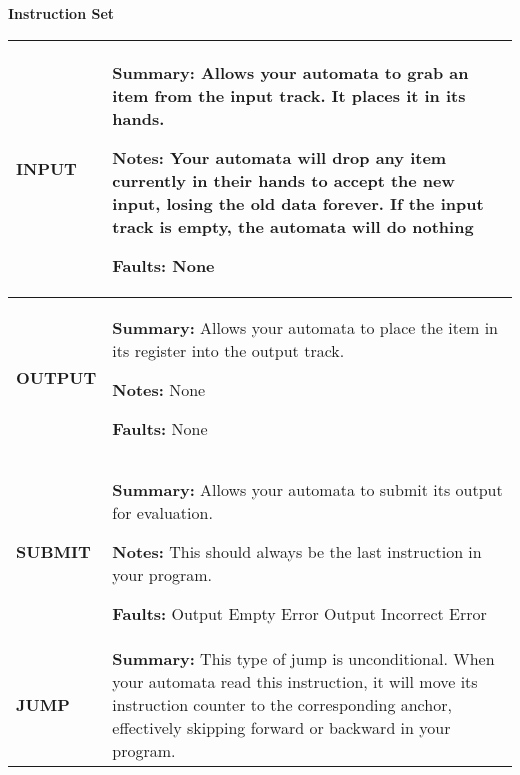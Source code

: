 \textbf{Instruction Set}
\begin{center}
    \begin{tabular}{ | m{3cm} | m{11cm} | } 
        \hline
            \begin{center}
                \textbf{INPUT} 
            \end{center}& 
            \textbf{Summary:} 
            \newline Allows your automata to grab an item from the input track. It places it in its hands.

            \textbf{Notes:} 
            \newline Your automata will drop any item currently in their hands to accept the new input, losing the old data forever.
            \newline If the input track is empty, the automata will do nothing

            \textbf{Faults:}
            \newline None\\
        \hline
            \begin{center}
                \textbf{OUTPUT} 
            \end{center}& 
            \textbf{Summary:} 
            \newline Allows your automata to place the item in its register into the output track.

            \textbf{Notes:} 
            \newline None

            \textbf{Faults:}
            \newline None\\
        \hline
            \begin{center}
                \textbf{SUBMIT} 
            \end{center}& 
            \textbf{Summary:} 
            \newline Allows your automata to submit its output for evaluation.

            \textbf{Notes:} 
            \newline This should always be the last instruction in your program.

            \textbf{Faults:}
            \newline Output Empty Error
            \newline Output Incorrect Error\\ 
        \hline
            \begin{center}
                \textbf{JUMP} 
            \end{center}& 
            \textbf{Summary:} 
            \newline This type of jump is unconditional. When your automata read this instruction, it will move its instruction 
            counter to the corresponding anchor, effectively skipping forward or backward in your program.


\end{tabular}
\end{center}
